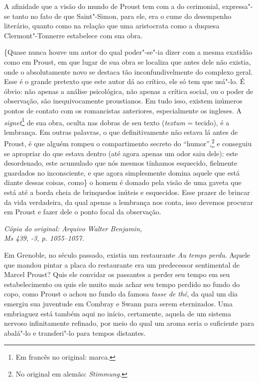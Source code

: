 A afinidade que a visão do mundo de Proust tem com a do cerimonial,
expressa"-se tanto no fato de que Saint"-Simon, para ele, era o cume do
desempenho literário, quanto como na relação que uma aristocrata como a
duquesa Clermont"-Tonnerre estabelece com sua obra.

\{Quase nunca houve um autor do qual poder"-se"-ia dizer com a mesma exatidão
como em Proust, em que lugar de sua obra se localiza que antes dele não
existia, onde o absolutamente novo se destaca tão inconfundivelmente do
complexo geral. Esse é o grande pretexto que este autor dá ao crítico,
ele só tem que usá"-lo. É óbvio: não apenas a análise psicológica, não apenas a crítica
social, ou o poder de observação, são inequivocamente proustianos. Em
tudo isso, existem inúmeros pontos de contato com os romancistas
anteriores, especialmente os ingleses. A \emph{signet}\footnote{Em francês no original: marca. \versal{[N.~T.]}} de sua obra, oculta nas dobras de
seu texto (\emph{textum} = tecido), é a lembrança. Em outras palavras, o
que definitivamente não estava lá antes de Proust, é que alguém rompeu o
compartimento secreto do ``humor'',\footnote{No original em alemão:
  \emph{Stimmung}. \versal{[N.~T.]}} e conseguiu se apropriar do que estava dentro (até
agora apenas um odor saiu dele): este desordenado, este acumulado que
nós mesmos tínhamos esquecido, fielmente guardados no inconsciente, e
que agora simplesmente domina aquele que está diante dessas coisas,
como\} o homem é domado pela visão de uma gaveta que está até a borda
cheia de brinquedos inúteis e esquecidos. Esse prazer de brincar da vida
verdadeira, da qual apenas a lembrança nos conta, isso devemos procurar
em Proust e fazer dele o ponto focal da observação.


\begin{flushright}
\emph{\footnotesize{Cópia do original: Arquivo Walter Benjamin,\\ Ms 439, -3, p. 1055--1057.}}
\end{flushright}

Em Grenoble, no século passado, existia um restaurante \emph{Au temps
perdu}. Aquele que mandou pintar a placa do restaurante era um
predecessor sentimental de Marcel Proust? Quis ele convidar os passantes
a perder seu tempo em seu estabelecimento ou quis ele muito mais achar
seu tempo perdido no fundo do copo, como Proust o achou no fundo da
famosa \emph{tasse de thé}, da qual um dia emergiu sua juventude em
Combray e Swann para serem eternizados. Uma embriaguez está também aqui
no início, certamente, aquela de um sistema nervoso infinitamente
refinado, por meio do qual um aroma seria o suficiente para abalá"-lo e
transferi"-lo para tempos distantes.

